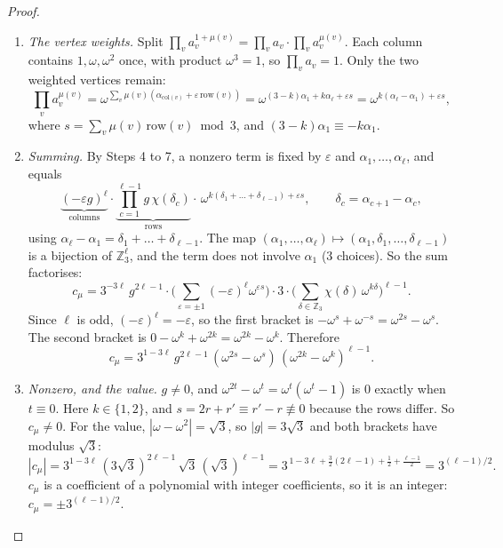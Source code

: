 \documentclass[11pt,oneside,openany]{book}
\newenvironment{steps}[1][]{\begin{enumerate}[label=\textbf{Step \arabic*.},leftmargin=4.2em,itemsep=0.3em,#1]}{\end{enumerate}}
\newcommand{\Z}{\mathbb{Z}}
\begin{document}
\begin{proof}
\begin{steps}[start=4]
\emph{If $\varepsilon_{c+1} = \varepsilon_c = \varepsilon$}, put $\delta = \beta - \alpha$. Then
\[ \prod_{i} \big(\omega^{\alpha + \varepsilon i} - \omega^{\beta + \varepsilon i}\big) = \omega^{3\alpha + 3\varepsilon}(1 - \omega^{\delta})^3 = (1 - \omega^\delta)^3
 = \begin{cases} 0 & \delta = 0, \\ -g & \delta = 1, \\ g & \delta = 2, \end{cases} \]
by the previous step. We write this as $g\,\chi(\delta)$ with $\chi(0) = 0$, $\chi(1) = -1$, $\chi(2) = 1$. It does not
depend on $\varepsilon$.
\item \emph{The vertex weights.} Split $\prod_v a_v^{1+\mu(v)} = \prod_v a_v \cdot \prod_v a_v^{\mu(v)}$. Each column contains
$1, \omega, \omega^2$ once, with product $\omega^3 = 1$, so $\prod_v a_v = 1$. Only the two weighted vertices remain:
\[ \prod_v a_v^{\mu(v)} = \omega^{\sum_v \mu(v)(\alpha_{\text{col}(v)} + \varepsilon\,\text{row}(v))}
 = \omega^{(3-k)\alpha_1 + k\alpha_\ell + \varepsilon s} = \omega^{k(\alpha_\ell - \alpha_1) + \varepsilon s}, \]
where $s = \sum_v \mu(v)\,\text{row}(v) \bmod 3$, and $(3 - k)\alpha_1 \equiv -k\alpha_1$.
\item \emph{Summing.} By Steps 4 to 7, a nonzero term is fixed by $\varepsilon$ and $\alpha_1, \dots, \alpha_\ell$, and equals
\[ \underbrace{(-\varepsilon g)^{\ell}}_{\text{columns}} \cdot \underbrace{\prod_{c=1}^{\ell-1} g\,\chi(\delta_c)}_{\text{rows}}
 \cdot\, \omega^{k(\delta_1 + \dots + \delta_{\ell-1}) + \varepsilon s}, \qquad \delta_c = \alpha_{c+1} - \alpha_c, \]
using $\alpha_\ell - \alpha_1 = \delta_1 + \dots + \delta_{\ell-1}$. The map $(\alpha_1, \dots, \alpha_\ell) \mapsto (\alpha_1, \delta_1, \dots, \delta_{\ell-1})$
is a bijection of $\Z_3^{\ell}$, and the term does not involve $\alpha_1$ (3 choices). So the sum factorises:
\[ c_\mu = 3^{-3\ell}\, g^{2\ell-1} \cdot \Big(\sum_{\varepsilon = \pm 1} (-\varepsilon)^{\ell} \omega^{\varepsilon s}\Big) \cdot 3 \cdot \Big(\sum_{\delta \in \Z_3} \chi(\delta)\,\omega^{k\delta}\Big)^{\ell-1}. \]
Since $\ell$ is odd, $(-\varepsilon)^\ell = -\varepsilon$, so the first bracket is $-\omega^{s} + \omega^{-s} = \omega^{2s} - \omega^s$. The second
bracket is $0 - \omega^{k} + \omega^{2k} = \omega^{2k} - \omega^k$. Therefore
\[ c_\mu = 3^{1-3\ell}\, g^{2\ell-1}\, (\omega^{2s} - \omega^{s})\, (\omega^{2k} - \omega^{k})^{\ell-1}. \]
\item \emph{Nonzero, and the value.} $g \ne 0$, and $\omega^{2t} - \omega^t = \omega^t(\omega^t - 1)$ is $0$ exactly when $t \equiv 0$.
Here $k \in \{1, 2\}$, and $s = 2r + r' \equiv r' - r \not\equiv 0$ because the rows differ. So $c_\mu \ne 0$. For the
value, $|\omega - \omega^2| = \sqrt3$, so $|g| = 3\sqrt3$ and both brackets have modulus $\sqrt3$:
\[ |c_\mu| = 3^{1-3\ell}\,(3\sqrt3)^{2\ell-1}\,\sqrt3\,(\sqrt3)^{\ell-1}
 = 3^{\,1 - 3\ell + \frac32(2\ell - 1) + \frac12 + \frac{\ell-1}{2}} = 3^{(\ell-1)/2}. \]
$c_\mu$ is a coefficient of a polynomial with integer coefficients, so it is an integer:
$c_\mu = \pm 3^{(\ell-1)/2}$. \qedhere
\end{steps}
\end{proof}
\end{document}
